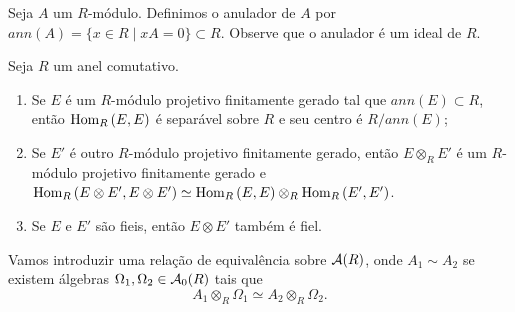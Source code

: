 Seja $A$ um $R$-módulo. Definimos o anulador de $A$ por $ann(A) = \{x \in R \;|\; xA = 0 \} \subset R$. Observe que o anulador é um ideal de $R$.
\begin{prop}\cite[Proposition 5.1.]{brauer}\label{prop:brauer2}
Seja $R$ um anel comutativo.
\begin{enumerate}
    \item Se $E$ é um $R$-módulo projetivo finitamente gerado tal que $ann(E) \subset R$, então $\textrm{Hom}_{R}\left( E,E \right)$ é separável sobre $R$ e seu centro é $R/ann(E)$;
    \item Se $E'$ é outro $R$-módulo projetivo finitamente gerado, então $E\otimes_R E'$ é um $R$-módulo projetivo finitamente gerado e $\textrm{Hom}_{R}\left( E\otimes E',E\otimes E' \right)\simeq \textrm{Hom}_{R}\left( E,E \right)\otimes_R \textrm{Hom}_{R}\left( E',E' \right)$.
    \item Se $E$ e $E'$ são fieis, então $E\otimes E'$ também é fiel.
\end{enumerate}
\end{prop}
Vamos introduzir uma relação de equivalência sobre $\mathcal{A}(R)$, onde $A_1 \sim A_2$ se existem álgebras $\Omega_1, \Omega_2 \in \mathcal{A}_0(R)$ tais que \[A_1 \otimes_R \Omega_1 \simeq A_2 \otimes_R \Omega_2.\]

